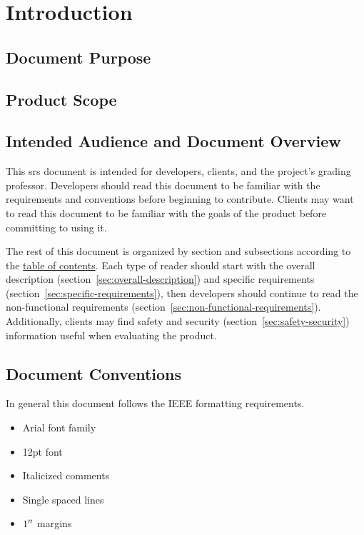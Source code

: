 
\section{Introduction}\label{sec:introduction}
    \subsection{Document Purpose}\label{sec:document-purpose}
    \subsection{Product Scope}\label{sec:product-scope}
    \subsection{Intended Audience and Document Overview}\label{sec:audience-overview}
        This \gls{srs} document is intended for developers, clients, and the project's grading professor. Developers should read this document to be familiar with the requirements and conventions before beginning to contribute. Clients may want to read this document to be familiar with the goals of the product before committing to using it.
        \par The rest of this document is organized by section and subsections according to the \hyperref[toc]{table of contents}. Each type of reader should start with the overall description (section~\ref{sec:overall-description}) and specific requirements (section~\ref{sec:specific-requirements}), then developers should continue to read the non-functional requirements (section~\ref{sec:non-functional-requirements}). Additionally, clients may find safety and security (section~\ref{sec:safety-security}) information useful when evaluating the product.
    \subsection{Document Conventions}\label{sec:document-conventions}
        In general this document follows the IEEE formatting requirements.
        \begin{itemize}
            \item Arial font family
            \item 12pt font
            \item Italicized comments
            \item Single spaced lines
            \item $1^{\prime\prime}$ margins
        \end{itemize}
